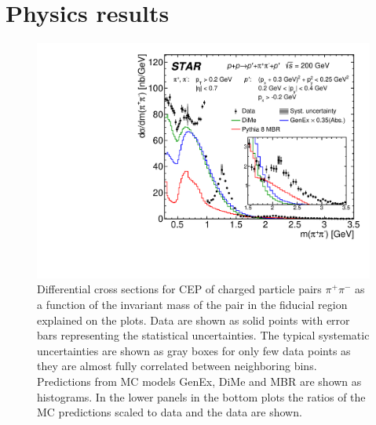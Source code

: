 

\chapter{Physics results}\label{chap:physicsResults}


\begin{figure}[t]
\centering
\includegraphics[width=.7\textwidth,page=1]{graphics/physicsResults/FinalResult_InvMass_pion.pdf}
%
\caption{Differential cross sections for CEP of charged particle pairs $\pi^+\pi^-$ as a function of the invariant mass of the pair in the fiducial region explained on the plots. Data are shown as solid points with error bars representing the statistical uncertainties. The typical systematic uncertainties are shown as gray boxes for only few data points as they are almost fully correlated between neighboring bins. Predictions from MC models GenEx, DiMe and MBR are shown as histograms. In the lower panels in the bottom plots the ratios of the MC predictions scaled to data and the data are shown.}
\label{results_01}
\end{figure}
%
